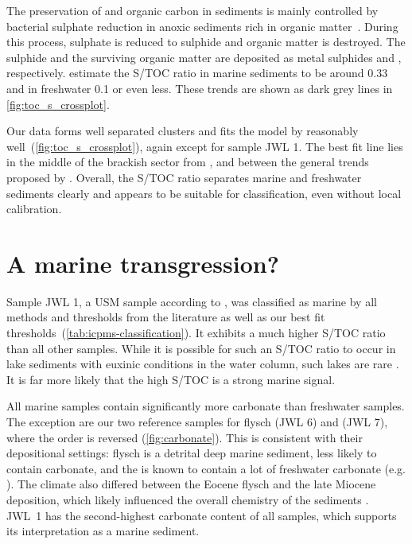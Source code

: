 The preservation of  and organic carbon in sediments is mainly controlled by 
bacterial sulphate reduction in anoxic sediments rich in organic matter~\parencite{berner-raiswell-1983}.
During this process, sulphate is reduced to sulphide and organic matter is destroyed. 
The sulphide and the surviving organic matter are deposited as metal sulphides and \TOC, respectively.
\textcite{berner-raiswell-1983} estimate the S/TOC ratio in marine sediments to be around 0.33 and
in freshwater 0.1 or even less. These trends are shown as dark grey lines in \cref{fig:toc_s_crossplot}.

Our data forms well separated clusters and fits the model by \textcite{wei-2020} 
reasonably well~(\cref{fig:toc_s_crossplot}), again except for sample JWL 1.
The best fit line lies in the middle of the brackish sector from \textcite{wei-2020}, 
and between the general trends proposed by \textcite{berner-raiswell-1983}. 
Overall, the S/TOC ratio separates marine and freshwater sediments
clearly and appears to be suitable for classification, even
without local calibration.

\section{A marine transgression?}

Sample JWL 1, a USM sample according to \textcite{Linth_Map}, was classified as marine
by all methods and thresholds from the literature as well as our best fit 
thresholds~(\cref{tab:icpms-classification}). 
It exhibits a much higher S/TOC ratio than all other samples. 
While it is possible for such an S/TOC ratio to occur in lake sediments with euxinic conditions 
in the water column, such lakes are rare \parencite{berner-raiswell-1983}. It is 
far more likely that the high S/TOC is a strong marine signal.

All marine samples contain
significantly more carbonate than freshwater samples. The exception are our two reference
samples for flysch (JWL 6) and \OSM (JWL 7), where the order is reversed (\cref{fig:carbonate}).
This is consistent with their depositional settings:
flysch is a detrital deep marine sediment, less likely to contain carbonate, and the \OSM is known to contain 
a lot of freshwater carbonate (e.g. \parencite{gubler_2009e}). The climate also differed 
between the Eocene flysch and the late Miocene \OSM deposition,
which likely influenced the overall chemistry of the sediments \parencite{schlunegger_possible_2007}.
JWL~1 has the second-highest carbonate content of all samples, which supports its interpretation as a 
marine sediment.

